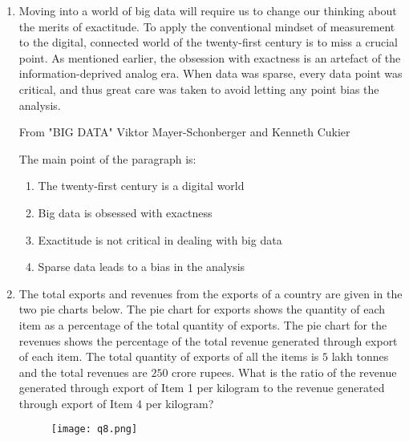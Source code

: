 \documentclass[journal,12pt,onecolumn]{IEEEtran}
\theoremstyle{remark}
\begin{document}
\begin{enumerate}
    \item Moving into a world of big data will require us to change our thinking about the merits of exactitude. To apply the conventional mindset of measurement to the digital, connected world of the twenty-first century is to miss a crucial point. As mentioned earlier, the obsession with exactness is an artefact of the information-deprived analog era. When data was sparse, every data point was critical, and thus great care was taken to avoid letting any point bias the analysis.
    
    From "BIG DATA" Viktor Mayer-Schonberger and Kenneth Cukier
    
    The main point of the paragraph is:
    
    \hfill{}
    \begin{enumerate}
        \item The twenty-first century is a digital world
        \item Big data is obsessed with exactness
        \item Exactitude is not critical in dealing with big data
        \item Sparse data leads to a bias in the analysis
    \end{enumerate}

    \item The total exports and revenues from the exports of a country are given in the two pie charts below. The pie chart for exports shows the quantity of each item as a percentage of the total quantity of exports. The pie chart for the revenues shows the percentage of the total revenue generated through export of each item. The total quantity of exports of all the items is $5$ lakh tonnes and the total revenues are $250$ crore rupees. What is the ratio of the revenue generated through export of Item 1 per kilogram to the revenue generated through export of Item 4 per kilogram?
    
    \begin{figure}[H]
        \centering
        \texttt{[image: q8.png]}
        \caption*{}
        \label{fig:q8}
    \end{figure}
    
    \hfill{}
    \begin{enumerate}
    \end{enumerate}


\end{enumerate}
\end{document}
